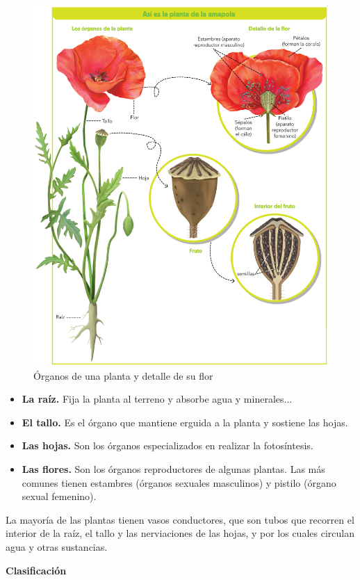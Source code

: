 \begin{figure}[!ht]
    \centering
    \includegraphics[width=0.8\linewidth]{Tema1/13_Amapola.png}
    \caption{Órganos de una planta y detalle de su flor}
    \label{fig:organos-planta}
\end{figure}

\begin{itemize}
    \item \textbf{La raíz.} Fija la planta al terreno y absorbe agua y minerales...
    \item \textbf{El tallo.} Es el órgano que mantiene erguida a la planta y sostiene las hojas.
    \item \textbf{Las hojas.} Son los órganos especializados en realizar la fotosíntesis.
    \item \textbf{Las flores.} Son los órganos reproductores de algunas plantas. Las más comunes tienen estambres (órganos sexuales masculinos) y pistilo (órgano sexual femenino).
\end{itemize}
La mayoría de las plantas tienen vasos conductores, que son tubos que recorren el interior de la raíz, el tallo y las nerviaciones de las hojas, y por los cuales circulan agua y otras sustancias.

\vspace{3mm}
\textbf{Clasificación}

